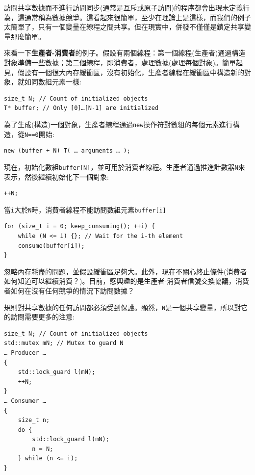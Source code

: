 
訪問共享數據而不進行訪問同步(通常是互斥或原子訪問)的程序都會出現未定義行為，這通常稱為數據競爭。這看起來很簡單，至少在理論上是這樣，而我們的例子太簡單了，只有一個變量在線程之間共享。但在現實中，併發不僅僅是鎖定共享變量那麼簡單。


來看一下\textbf{生產者-消費者}的例子。假設有兩個線程：第一個線程(生產者)通過構造對象準備一些數據；第二個線程，即消費者，處理數據(處理每個對象)。簡單起見，假設有一個很大內存緩衝區，沒有初始化，生產者線程在緩衝區中構造新的對象，就如同數組元素一樣:

\begin{lstlisting}[style=styleCXX]
size_t N; // Count of initialized objects
T* buffer; // Only [0]…[N-1] are initialized
\end{lstlisting}

為了生成(構造)一個對象，生產者線程通過\texttt{new}操作符對數組的每個元素進行構造，從\texttt{N==0}開始:

\begin{lstlisting}[style=styleCXX]
new (buffer + N) T( … arguments … );
\end{lstlisting}

現在，初始化數組\texttt{buffer[N]}，並可用於消費者線程。生產者通過推進計數器\texttt{N}來表示，然後繼續初始化下一個對象:

\begin{lstlisting}[style=styleCXX]
++N;
\end{lstlisting}

當\texttt{i}大於\texttt{N}時，消費者線程不能訪問數組元素\texttt{buffer[i]}

\begin{lstlisting}[style=styleCXX]
for (size_t i = 0; keep_consuming(); ++i) {
	while (N <= i) {}; // Wait for the i-th element
	consume(buffer[i]);
}
\end{lstlisting}

忽略內存耗盡的問題，並假設緩衝區足夠大。此外，現在不關心終止條件(消費者如何知道可以繼續消費？)。目前，感興趣的是生產者-消費者信號交換協議，消費者如何在沒有任何競爭的情況下訪問數據？

規則對共享數據的任何訪問都必須受到保護。顯然，\texttt{N}是一個共享變量，所以對它的訪問需要更多的注意:

\begin{lstlisting}[style=styleCXX]
size_t N; // Count of initialized objects
std::mutex mN; // Mutex to guard N
… Producer …
{
	std::lock_guard l(mN);
	++N;
}
… Consumer …
{
	size_t n;
	do {
		std::lock_guard l(mN);
		n = N;
	} while (n <= i);
}
\end{lstlisting}

